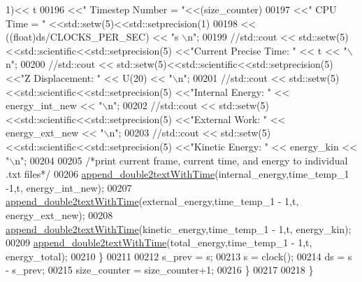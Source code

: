 \begin{DoxyCode}
      1)<< t
00196                                                     <<\textcolor{stringliteral}{"  Timestep Number = "}<<(size\_counter)
00197                                                     <<\textcolor{stringliteral}{"  CPU Time = "} <<std::setw(5)<<std::setprecision(1)
00198                                                         << ((float)ds/CLOCKS\_PER\_SEC) << \textcolor{stringliteral}{"s \(\backslash\)n"};
00199                     \textcolor{comment}{//std::cout << std::setw(5)<<std::scientific<<std::setprecision(5) <<"Current Precise
       Time: " << t << "\(\backslash\)n";}
00200                     \textcolor{comment}{//std::cout << std::setw(5)<<std::scientific<<std::setprecision(5) <<"Z Displacement: "
       << U(20) << "\(\backslash\)n";}
00201                     \textcolor{comment}{//std::cout << std::setw(5)<<std::scientific<<std::setprecision(5) <<"Internal Energy:
       " << energy\_int\_new << "\(\backslash\)n";}
00202                     \textcolor{comment}{//std::cout << std::setw(5)<<std::scientific<<std::setprecision(5) <<"External Work: "
       << energy\_ext\_new << "\(\backslash\)n";}
00203                     \textcolor{comment}{//std::cout << std::setw(5)<<std::scientific<<std::setprecision(5) <<"Kinetic Energy: "
       << energy\_kin << "\(\backslash\)n";}
00204 
00205                     \textcolor{comment}{/*print current frame, current time, and energy to individual .txt files*/}
00206                     \hyperlink{functions_8h_a6908d3739a96b475c5f4c1623fad9316}{append\_double2textWithTime}(internal\_energy,time\_temp\_1 -1,t,
      energy\_int\_new);
00207                     \hyperlink{functions_8h_a6908d3739a96b475c5f4c1623fad9316}{append\_double2textWithTime}(external\_energy,time\_temp\_1 - 1,t,
      energy\_ext\_new);
00208                     \hyperlink{functions_8h_a6908d3739a96b475c5f4c1623fad9316}{append\_double2textWithTime}(kinetic\_energy,time\_temp\_1 - 1,t,
      energy\_kin);
00209                     \hyperlink{functions_8h_a6908d3739a96b475c5f4c1623fad9316}{append\_double2textWithTime}(total\_energy,time\_temp\_1 - 1,t,
      energy\_total);
00210             \}
00211 
00212             s\_prev = s;
00213             s = clock();
00214             ds = s - s\_prev;
00215             size\_counter = size\_counter+1;
00216         \}
00217 
00218 \}
\end{DoxyCode}
